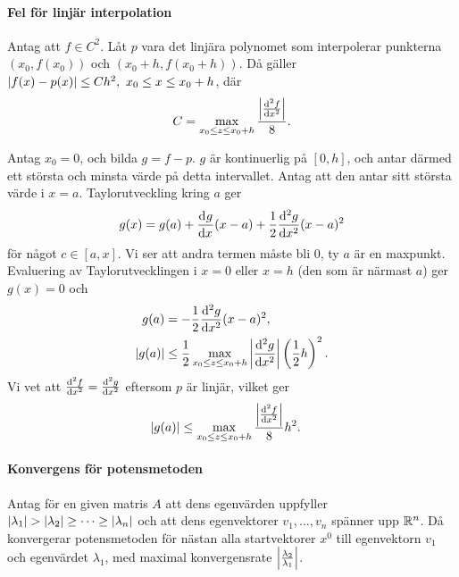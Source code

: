\paragraph{Fel för linjär interpolation}
Antag att $f\in C^{2}$. Låt $p$ vara det linjära polynomet som interpolerar punkterna $(x_{0}, f(x_{0}))$ och $(x_{0} + h, f(x_{0} + h))$. Då gäller $\abs{f(x) - p(x)} \leq Ch^{2},\ x_{0} \leq x \leq x_{0} + h$, där
\begin{align*}
	C = \max\limits_{x_{0} \leq z \leq x_{0} + h}\frac{\abs{\dv[2]{f}{x} (z)}}{8}.
\end{align*}

\proof
Antag $x_{0} = 0$, och bilda $g = f - p$. $g$ är kontinuerlig på $[0, h]$, och antar därmed ett största och minsta värde på detta intervallet. Antag att den antar sitt största värde i $x = a$. Taylorutveckling kring $a$ ger
\begin{align*}
	g(x) = g(a) + \dv[]{g}{x} (a)(x - a) + \frac{1}{2}\dv[2]{g}{x} (c)(x - a)^{2}
\end{align*}
för något $c\in [a, x]$. Vi ser att andra termen måste bli $0$, ty $a$ är en maxpunkt. Evaluering av Taylorutvecklingen i $x = 0$ eller $x = h$ (den som är närmast $a$) ger $g(x) = 0$ och
\begin{align*}
	g(a)       &= -\frac{1}{2}\dv[2]{g}{x} (c)(x - a)^{2}, \\
	\abs{g(a)} &\leq \frac{1}{2}\max\limits_{x_{0} \leq z \leq x_{0} + h}\abs{\dv[2]{g}{x} (z)}\left(\frac{1}{2}h\right)^{2}.
\end{align*}
Vi vet att $\dv[2]{f}{x} (x) = \dv[2]{g}{x} (x)$ eftersom $p$ är linjär, vilket ger
\begin{align*}
	\abs{g(a)} &\leq \max\limits_{x_{0} \leq z \leq x_{0} + h}\frac{\abs{\dv[2]{f}{x} (z)}}{8}h^{2}.
\end{align*}

\paragraph{Konvergens för potensmetoden}
Antag för en given matris $A$ att dens egenvärden uppfyller $\abs{\lambda_{1}} > \abs{\lambda_{2}} \geq \dots \geq \abs{\lambda_{n}}$ och att dens egenvektorer $v_{1}, \dots, v_{n}$ spänner upp $\mathbb{R}^{n}$. Då konvergerar potensmetoden för nästan alla startvektorer $x^{0}$ till egenvektorn $v_{1}$ och egenvärdet $\lambda_{1}$, med maximal konvergensrate $\abs{\frac{\lambda_{2}}{\lambda_{1}}}$.


